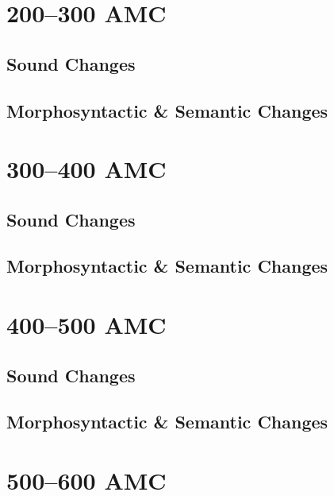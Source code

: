 \documentclass[a4paper,11pt,twoside,openany]{memoir}
\begin{document}
\section{200--300 AMC}

\subsection{Sound Changes}


\subsection{Morphosyntactic \& Semantic Changes}


\section{300--400 AMC}

\subsection{Sound Changes}


\subsection{Morphosyntactic \& Semantic Changes}


\section{400--500 AMC}

\subsection{Sound Changes}


\subsection{Morphosyntactic \& Semantic Changes}


\section{500--600 AMC}
\end{document}
